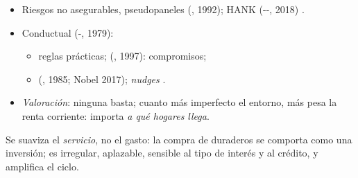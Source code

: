 \documentclass{article}
\begin{document}
\begin{columnas}
\begin{itemize}
\end{itemize}
\begin{itemize}
\item Riesgos no asegurables, pseudopaneles (, 1992); HANK (--, 2018) .
\item Conductual (-, 1979):
  \begin{itemize}
  \item reglas prácticas;  (, 1997): compromisos;
  \item {} (, 1985; Nobel 2017); \emph{nudges} .
  \end{itemize}
\item \emph{Valoración}: ninguna basta; cuanto más imperfecto el entorno, más pesa la renta corriente: importa \emph{a qué hogares llega}.
\end{itemize}

\begin{ideaclave}
Se suaviza el \emph{servicio}, no el gasto: la compra de duraderos se comporta como una inversión; es irregular, aplazable, sensible al tipo de interés y al crédito, y amplifica el ciclo.
\end{ideaclave}


\end{columnas}
\end{document}
